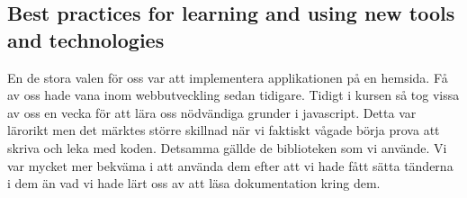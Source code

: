 \documentclass{scrartcl}
\begin{document}

\subsection{Best practices for learning and using new tools and technologies}








En de stora valen för oss var att implementera applikationen på en hemsida. Få av oss hade vana inom webbutveckling sedan tidigare. Tidigt i kursen så tog vissa av oss en vecka för att lära oss nödvändiga grunder i javascript. Detta var lärorikt men det märktes större skillnad när vi faktiskt vågade börja prova att skriva och leka med koden. Detsamma gällde de biblioteken som vi använde. Vi var mycket mer bekväma i att använda dem efter att vi hade fått sätta tänderna i dem än vad vi hade lärt oss av att läsa dokumentation kring dem. 


\end{document}

